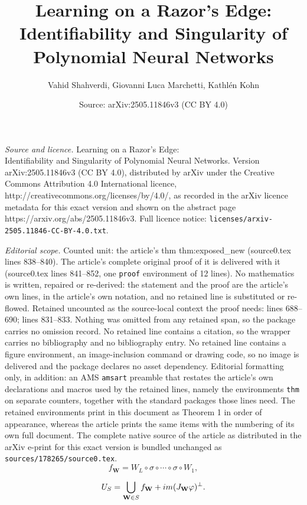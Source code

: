 \documentclass[10pt,a4paper]{amsart}
\title{Learning on a Razor’s Edge: \\ Identifiability and Singularity of Polynomial Neural Networks}
\author{Vahid Shahverdi, Giovanni Luca Marchetti, Kathl\'en Kohn}
\date{Source: arXiv:2505.11846v3 (CC BY 4.0)}
\newcommand{\jacob}{\textnormal{\textbf{J}}}
\begin{document}
\maketitle

\noindent\emph{Source and licence.} Learning on a Razor’s Edge: \\ Identifiability and Singularity of Polynomial Neural Networks. Version arXiv:2505.11846v3 (CC BY 4.0), distributed by arXiv under the Creative Commons Attribution 4.0 International licence, http://creativecommons.org/licenses/by/4.0/, as recorded in the arXiv licence metadata for this exact version and shown on the abstract page https://arxiv.org/abs/2505.11846v3. Full licence notice: \texttt{licenses/arxiv-2505.11846-CC-BY-4.0.txt}.\par\smallskip

\noindent\textit{Editorial scope.} Counted unit: the article's thm thm:exposed\_new (source0.tex lines 838--840). The article's complete original proof of it is delivered with it (source0.tex lines 841--852, one \texttt{proof} environment of 12 lines). No mathematics is written, repaired or re-derived: the statement and the proof are the article's own lines, in the article's own notation, and no retained line is substituted or re-flowed.  Retained uncounted as the source-local context the proof needs: lines 688--690; lines 831--833.  Nothing was omitted from any retained span, so the package carries no omission record.  No retained line contains a citation, so the wrapper carries no bibliography and no bibliography entry.  No retained line contains a figure environment, an image-inclusion command or drawing code, so no image is delivered and the package declares no asset dependency.  Editorial formatting only, in addition: an AMS \texttt{amsart} preamble that restates the article's own declarations and macros used by the retained lines, namely the environments \texttt{thm} on separate counters, together with the standard packages those lines need.  The retained environments print in this document as Theorem 1 in order of appearance, whereas the article prints the same items with the numbering of its own full document.  The complete native source of the article as distributed in the arXiv e-print for this exact version is bundled unchanged as \texttt{sources/178265/source0.tex}.
\begin{equation}\label{eq:mlpdef}
f_\mathbf{W} = W_{L} \circ \sigma \circ \cdots \circ \sigma \circ W_1,
\end{equation}

\begin{equation}\label{eq:affamily}
U_S = \bigcup_{\mathbf{W} \in S} f_\mathbf{W} + \textnormal{im}( \jacob_\mathbf{W}\varphi)^\perp. 
\end{equation}
\end{document}
